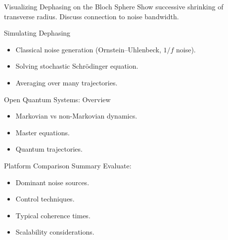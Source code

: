 \documentclass{beamer}
\begin{document}
  \begin{frame}{Visualizing Dephasing on the Bloch Sphere}
    Show successive shrinking of transverse radius.
    Discuss connection to noise bandwidth.
  \end{frame}

  \begin{frame}{Simulating Dephasing}
    \begin{itemize}
    \item Classical noise generation (Ornstein–Uhlenbeck, $1/f$ noise).
    \item Solving stochastic Schrödinger equation.
    \item Averaging over many trajectories.
    \end{itemize}
  \end{frame}

  \begin{frame}{Open Quantum Systems: Overview}
    \begin{itemize}
    \item Markovian vs non-Markovian dynamics.
    \item Master equations.
    \item Quantum trajectories.
    \end{itemize}
  \end{frame}

  \begin{frame}{Platform Comparison Summary}
    Evaluate:
    \begin{itemize}
    \item Dominant noise sources.
    \item Control techniques.
    \item Typical coherence times.
    \item Scalability considerations.
    \end{itemize}
  \end{frame}

\end{document}
